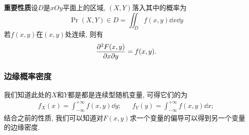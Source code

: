 \textbf{重要性质}\quad 设$D$是$xOy$平面上的区域, $(X, Y )$落入其中的概率为
\begin{equation}
    \Pr{(X, Y)\in D} = \iint_D f(x, y)\dd{x}\dd{y}
\end{equation}
若$f(x, y)$在$(x, y )$处连续, 则有
\begin{equation}
    \pdv{F(x, y)}{x}{y} = f(x, y).
\end{equation}
\subsubsection{边缘概率密度}\label{sec:marginPDF}
我们知道此处的$X$和$Y$都是都是连续型随机变量, 可得它们的为
\begin{align}
    f_X(x)=\int_{-\infty}^{+\infty}f(x, y )\dd{y}; &  & f_Y(y)=\int_{-\infty}^{+\infty}f(x, y )\dd{x};
    \label{eq:3.12}
\end{align}
结合之前的性质, 我们可以知道对$F(x, y)$求一个变量的偏导可以得到另一个变量的边缘密度.
